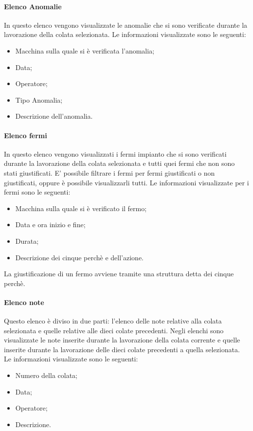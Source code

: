   \paragraph{Elenco Anomalie}
  In questo elenco vengono visualizzate le anomalie che si sono verificate durante la lavorazione della colata 
  selezionata. Le informazioni visualizzate sono le seguenti:
  \begin{itemize}
    \item Macchina sulla quale si è verificata l'anomalia;
    \item Data;
    \item Operatore;
    \item Tipo Anomalia;
    \item Descrizione dell'anomalia.
  \end{itemize} 
  
  
  \paragraph{Elenco fermi}
  In questo elenco vengono visualizzati i fermi impianto che si sono verificati durante la lavorazione della colata selezionata e 
  tutti quei fermi che non sono stati giustificati. E' possibile filtrare i fermi per fermi giustificati 
  o non giustificati, oppure è possibile visualizzarli tutti. Le informazioni visualizzate per i fermi 
  sono le seguenti:
  \begin{itemize}
    \item Macchina sulla quale si è verificato il fermo;
    \item Data e ora inizio e fine;
    \item Durata;
    \item Descrizione dei cinque perchè e dell’azione.
  \end{itemize}
  La giustificazione di un fermo avviene tramite una struttura detta dei cinque perchè.
    
  \paragraph{Elenco note}
  Questo elenco è diviso in due parti: l'elenco delle note relative alla colata selezionata e quelle relative alle 
  dieci colate precedenti. Negli elenchi sono visualizzate le note inserite durante la lavorazione della colata corrente 
  e quelle inserite durante la lavorazione delle dieci colate precedenti a quella selezionata. 
  Le informazioni visualizzate sono le seguenti:
  \begin{itemize}
    \item Numero della colata;
    \item Data;
    \item Operatore;
    \item Descrizione.
  \end{itemize}   


